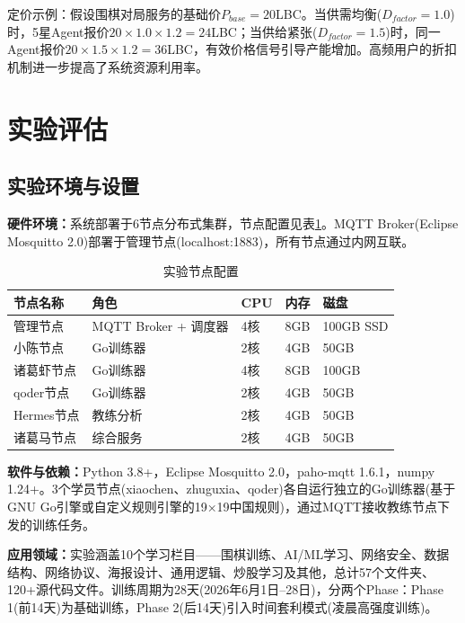 \documentclass[12pt,a4paper]{ctexart}
\begin{document}
定价示例：假设围棋对局服务的基础价$P_{base}=20$LBC。当供需均衡($D_{factor}=1.0$)时，5星Agent报价$20 \times 1.0 \times 1.2 = 24$LBC；当供给紧张($D_{factor}=1.5$)时，同一Agent报价$20 \times 1.5 \times 1.2=36$LBC，有效价格信号引导产能增加。高频用户的折扣机制进一步提高了系统资源利用率。

\section{实验评估}

\subsection{实验环境与设置}

\textbf{硬件环境：}系统部署于6节点分布式集群，节点配置见表\ref{tab:nodes}。MQTT Broker(Eclipse Mosquitto 2.0)部署于管理节点(localhost:1883)，所有节点通过内网互联。

\begin{table}[H]
\centering
\caption{实验节点配置}
\label{tab:nodes}
\begin{tabular}{lllll}
\toprule
节点名称 & 角色 & CPU & 内存 & 磁盘 \\
\midrule
管理节点 & MQTT Broker + 调度器 & 4核 & 8GB & 100GB SSD \\
小陈节点 & Go训练器 & 2核 & 4GB & 50GB \\
诸葛虾节点 & Go训练器 & 4核 & 8GB & 100GB \\
qoder节点 & Go训练器 & 2核 & 4GB & 50GB \\
Hermes节点 & 教练分析 & 2核 & 4GB & 50GB \\
诸葛马节点 & 综合服务 & 2核 & 4GB & 50GB \\
\bottomrule
\end{tabular}
\end{table}

\textbf{软件与依赖：}Python 3.8+，Eclipse Mosquitto 2.0，paho-mqtt 1.6.1，numpy 1.24+。3个学员节点(xiaochen、zhuguxia、qoder)各自运行独立的Go训练器(基于GNU Go引擎或自定义规则引擎的19×19中国规则)，通过MQTT接收教练节点下发的训练任务。

\textbf{应用领域：}实验涵盖10个学习栏目——围棋训练、AI/ML学习、网络安全、数据结构、网络协议、海报设计、通用逻辑、炒股学习及其他，总计57个文件夹、120+源代码文件。训练周期为28天(2026年6月1日--28日)，分两个Phase：Phase 1(前14天)为基础训练，Phase 2(后14天)引入时间套利模式(凌晨高强度训练)。
\end{document}
